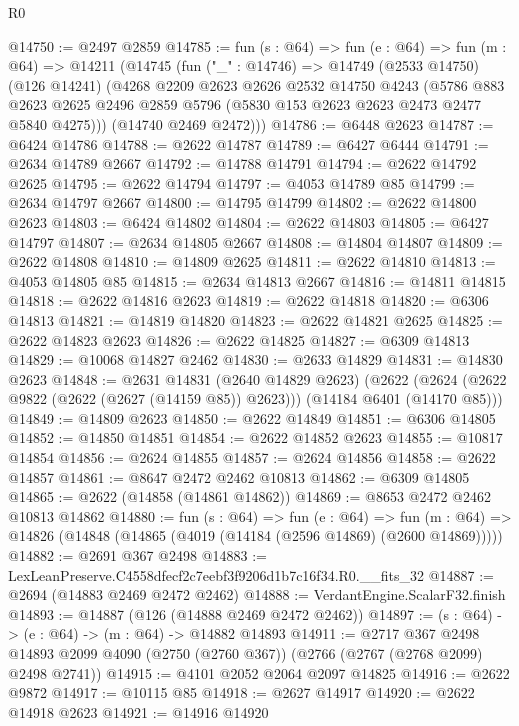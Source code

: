 \begin{lexlean}{R0}
\begin{coremodule}
@14750 := @2497 @2859
@14785 := fun (s : @64) =>
  fun (e : @64) =>
  fun (m : @64) =>
  @14211
    (@14745
      (fun ("_" : @14746) =>
      @14749
        (@2533 @14750)
        (@126 @14241)
        (@4268
          @2209
          @2623
          @2626
          @2532
          @14750
          @4243
          (@5786
            @883
            @2623
            @2625
            @2496
            @2859
            @5796
            (@5830 @153 @2623 @2623 @2473 @2477 @5840 @4275)))
        (@14740 @2469 @2472)))
@14786 := @6448 @2623
@14787 := @6424 @14786
@14788 := @2622 @14787
@14789 := @6427 @6444
@14791 := @2634 @14789 @2667
@14792 := @14788 @14791
@14794 := @2622 @14792 @2625
@14795 := @2622 @14794
@14797 := @4053 @14789 @85
@14799 := @2634 @14797 @2667
@14800 := @14795 @14799
@14802 := @2622 @14800 @2623
@14803 := @6424 @14802
@14804 := @2622 @14803
@14805 := @6427 @14797
@14807 := @2634 @14805 @2667
@14808 := @14804 @14807
@14809 := @2622 @14808
@14810 := @14809 @2625
@14811 := @2622 @14810
@14813 := @4053 @14805 @85
@14815 := @2634 @14813 @2667
@14816 := @14811 @14815
@14818 := @2622 @14816 @2623
@14819 := @2622 @14818
@14820 := @6306 @14813
@14821 := @14819 @14820
@14823 := @2622 @14821 @2625
@14825 := @2622 @14823 @2623
@14826 := @2622 @14825
@14827 := @6309 @14813
@14829 := @10068 @14827 @2462
@14830 := @2633 @14829
@14831 := @14830 @2623
@14848 := @2631
    @14831
    (@2640 @14829 @2623)
    (@2622 (@2624 (@2622 @9822 (@2622 (@2627 (@14159 @85)) @2623))) (@14184 @6401 (@14170 @85)))
@14849 := @14809 @2623
@14850 := @2622 @14849
@14851 := @6306 @14805
@14852 := @14850 @14851
@14854 := @2622 @14852 @2623
@14855 := @10817 @14854
@14856 := @2624 @14855
@14857 := @2624 @14856
@14858 := @2622 @14857
@14861 := @8647 @2472 @2462 @10813
@14862 := @6309 @14805
@14865 := @2622 (@14858 (@14861 @14862))
@14869 := @8653 @2472 @2462 @10813 @14862
@14880 := fun (s : @64) =>
  fun (e : @64) =>
  fun (m : @64) => @14826 (@14848 (@14865 (@4019 (@14184 (@2596 @14869) (@2600 @14869)))))
@14882 := @2691 @367 @2498
@14883 := LexLeanPreserve.C4558dfecf2c7eebf3f9206d1b7c16f34.R0.__fits_32
@14887 := @2694 (@14883 @2469 @2472 @2462)
@14888 := VerdantEngine.ScalarF32.finish
@14893 := @14887 (@126 (@14888 @2469 @2472 @2462))
@14897 := (s : @64) -> (e : @64) -> (m : @64) -> @14882 @14893
@14911 := @2717
    @367
    @2498
    @14893
    @2099
    @4090
    (@2750 (@2760 @367))
    (@2766 (@2767 (@2768 @2099) @2498 @2741))
@14915 := @4101 @2052 @2064 @2097 @14825
@14916 := @2622 @9872
@14917 := @10115 @85
@14918 := @2627 @14917
@14920 := @2622 @14918 @2623
@14921 := @14916 @14920

\end{coremodule}
\end{lexlean}
